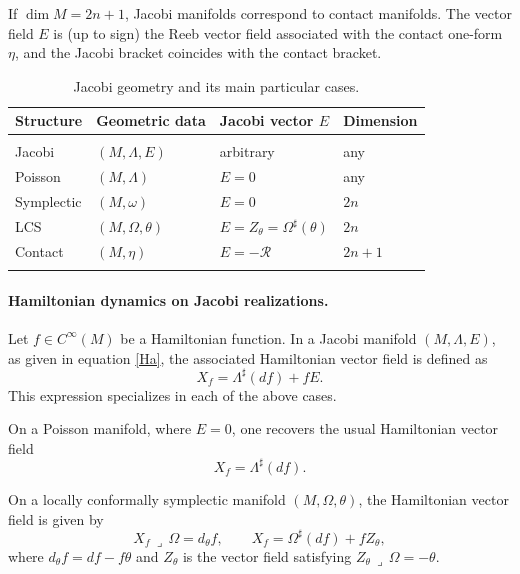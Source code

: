 \documentclass{article}
\theoremstyle{remark}
\theoremstyle{definition}
\newcommand{\contract}{\,\lrcorner\,}
\begin{document}
If $\dim M=2n+1$, Jacobi manifolds correspond to contact manifolds. The vector
field $E$ is (up to sign) the Reeb vector field associated with the contact
one-form $\eta$, and the Jacobi bracket coincides with the contact bracket.

\begin{table}[ht]
\centering
\footnotesize
\begin{tabular}{l l l l}
\hline
Structure & Geometric data & Jacobi vector $E$ & Dimension \\
\hline \\[0.1ex]
Jacobi
& $(M,\Lambda,E)$
& arbitrary
& any \\[0.6ex]

Poisson
& $(M,\Lambda)$
& $E=0$
& any \\[0.6ex]

Symplectic
& $(M,\omega)$
& $E=0$
& $2n$ \\[0.6ex]

LCS
& $(M,\Omega,\theta)$
& $E=Z_\theta=\Omega^\sharp(\theta)$
& $2n$ \\[0.6ex]

Contact
& $(M,\eta)$
& $E=-\mathcal{R}$
& $2n+1$ \\[0.6ex]
\\[0.1ex] \hline
\end{tabular}
\caption{{\small Jacobi geometry and its main particular cases.}}
\label{Jacobi-summary}
\end{table}


\paragraph{Hamiltonian dynamics on Jacobi realizations.}
Let $f\in C^\infty(M)$ be a Hamiltonian function. In a Jacobi manifold $(M, \Lambda, E)$, as given in equation \eqref{Ha}, the associated Hamiltonian vector field is defined as
\[
X_f = \Lambda^\sharp(df) + fE .
\]
This expression specializes in each of the above cases.

On a Poisson manifold, where $E=0$, one recovers the usual Hamiltonian vector
field
\[
X_f=\Lambda^\sharp(df).
\]

On a locally conformally symplectic manifold $(M,\Omega,\theta)$, the Hamiltonian
vector field is given by
\[
X_f\contract\Omega=d_\theta f,
\qquad
X_f=\Omega^\sharp(df)+fZ_\theta,
\]
where $d_\theta f=df-f\theta$ and  $Z_\theta$ is the vector field satisfying $Z_\theta\contract\Omega=-\theta.$
\end{document}

